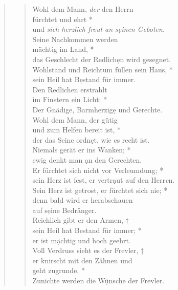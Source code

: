 
\medskip


\begin{quote}
\begin{verse}
Wohl dem Mann, \textit{der} den Herrn\\
fürchtet und ehrt *\\
und \textit{sich herzlich freut an s\d einen Geboten.}\\
\vin Seine Nachkommen werden\\ 
\vin mächtig im Land, *\\
\vin das Geschlecht der Redlich\d en wird gesegnet.\\
Wohlstand und Reichtum füllen sein Haus, *\\
sein Heil hat B\d estand für immer.\\
\vin Den Redlichen erstrahlt\\
\vin im Finstern ein Licht: *\\
\vin Der Gnädige, Barmherzig\d e und Gerechte.\\
Wohl dem Mann, der gütig\\
und zum Helfen bereit ist, *\\
der das Seine ordn\d et, wie es recht ist.\\
\vin Niemals gerät er ins Wanken; *\\
\vin ewig denkt man \d an den Gerechten.\\
Er fürchtet sich nicht vor Verleumdung; *\\
sein Herz ist fest, er vertr\d aut auf den Herr\textit{e}n.\\
\vin Sein Herz ist getrost, er fürchtet sich nie; *\\
\vin denn bald wird er herabschauen\\
\vin auf s\d eine Bedränger.\\
Reichlich gibt er den Armen, †\\
sein Heil hat Bestand für immer; *\\
er ist m\d ächtig und hoch geehrt.\\
\vin Voll Verdruss sieht es der Frevler, †\\
\vin er knirscht mit den Zähnen und\\ 
\vin geht zugrunde. *\\
\vin Zunichte werden die W\d ünsche der Frevler.\\
\end{verse}

\end{quote}


